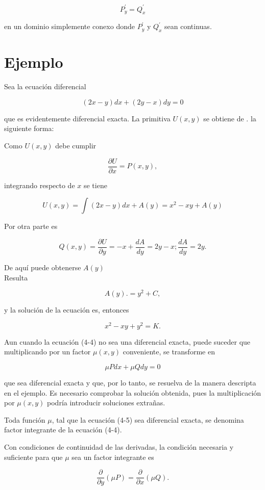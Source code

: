 \documentclass[10pt]{article}
\theoremstyle{plain}
\theoremstyle{definition}
\theoremstyle{remark}
\begin{document}
$$
P_{y}^{\prime}=Q_{x}^{\prime}
$$

en un dominio simplemente conexo donde $P_{y}^{\prime}$ y $Q_{x}^{\prime}$ sean continuas.

\section*{Ejemplo}
Sea la ecuación diferencial

$$
(2 x-y) d x+(2 y-x) d y=0
$$

que es evidentemente diferencial exacta. La primitiva $U(x, y)$ se obtiene de . la siguiente forma:

Como $U(x, y)$ debe cumplir

$$
\frac{\partial U}{\partial x}=P(x, y),
$$

integrando respecto de $x$ se tiene

$$
U(x, y)=\int(2 x-y) d x+A(y)=x^{2}-x y+A(y)
$$

Por otra parte es

$$
Q(x, y)=\frac{\partial U}{\partial y}=-x+\frac{d A}{d y}=2 y-x ; \frac{d A}{d y}=2 y .
$$


De aquí puede obtenerse $A(y)$\\
Resulta

$$
A(y) .=y^{2}+C,
$$

y la solución de la ecuación es, entonces

$$
x^{2}-x y+y^{2}=K .
$$

Aun cuando la ecuación (4-4) no sea una diferencial exacta, puede suceder que multiplicando por un factor $\mu(x, y)$ conveniente, se transforme en


\begin{equation*}
\mu P d x+\mu Q d y=0 \tag{$4\cdot5$}
\end{equation*}


que sea diferencial exacta y que, por lo tanto, se resuelva de la manera descripta en el ejemplo. Es necesario comprobar la solución obtenida, pues la multiplicación por $\mu(x, y)$ podría introducir soluciones extrañas.

Toda función $\mu$, tal que la ecuación (4-5) sea diferencial exacta, se denomina factor integrante de la ecuación (4-4).

Con condiciones de continuidad de las derivadas, la condición necesaria y suficiente para que $\mu$ sea un factor integrante es

$$
\frac{\partial}{\partial y}(\mu P)=\frac{\partial}{\partial x}(\mu Q) .
$$
\end{document}
